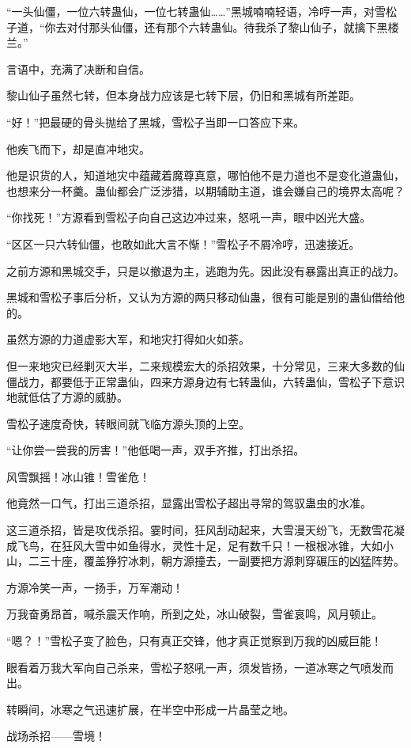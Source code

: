 \begin{this_body}
“一头仙僵，一位六转蛊仙，一位七转蛊仙……”黑城喃喃轻语，冷哼一声，对雪松子道，“你去对付那头仙僵，还有那个六转蛊仙。待我杀了黎山仙子，就擒下黑楼兰。”

言语中，充满了决断和自信。

黎山仙子虽然七转，但本身战力应该是七转下层，仍旧和黑城有所差距。

“好！”把最硬的骨头抛给了黑城，雪松子当即一口答应下来。

他疾飞而下，却是直冲地灾。

他是识货的人，知道地灾中蕴藏着魔尊真意，哪怕他不是力道也不是变化道蛊仙，也想来分一杯羹。蛊仙都会广泛涉猎，以期辅助主道，谁会嫌自己的境界太高呢？

“你找死！”方源看到雪松子向自己这边冲过来，怒吼一声，眼中凶光大盛。

“区区一只六转仙僵，也敢如此大言不惭！”雪松子不屑冷哼，迅速接近。

之前方源和黑城交手，只是以撤退为主，逃跑为先。因此没有暴露出真正的战力。

黑城和雪松子事后分析，又认为方源的两只移动仙蛊，很有可能是别的蛊仙借给他的。

虽然方源的力道虚影大军，和地灾打得如火如荼。

但一来地灾已经剿灭大半，二来规模宏大的杀招效果，十分常见，三来大多数的仙僵战力，都要低于正常蛊仙，四来方源身边有七转蛊仙，六转蛊仙，雪松子下意识地就低估了方源的威胁。

雪松子速度奇快，转眼间就飞临方源头顶的上空。

“让你尝一尝我的厉害！”他低喝一声，双手齐推，打出杀招。

风雪飘摇！冰山锥！雪雀危！

他竟然一口气，打出三道杀招，显露出雪松子超出寻常的驾驭蛊虫的水准。

这三道杀招，皆是攻伐杀招。霎时间，狂风刮动起来，大雪漫天纷飞，无数雪花凝成飞鸟，在狂风大雪中如鱼得水，灵性十足，足有数千只！一根根冰锥，大如小山，二三十座，覆盖狰狞冰刺，朝方源撞去，一副要把方源刺穿碾压的凶猛阵势。

方源冷笑一声，一扬手，万军潮动！

万我奋勇昂首，喊杀震天作响，所到之处，冰山破裂，雪雀哀鸣，风月顿止。

“嗯？！”雪松子变了脸色，只有真正交锋，他才真正觉察到万我的凶威巨能！

眼看着万我大军向自己杀来，雪松子怒吼一声，须发皆扬，一道冰寒之气喷发而出。

转瞬间，冰寒之气迅速扩展，在半空中形成一片晶莹之地。

战场杀招——雪境！


\end{this_body}
